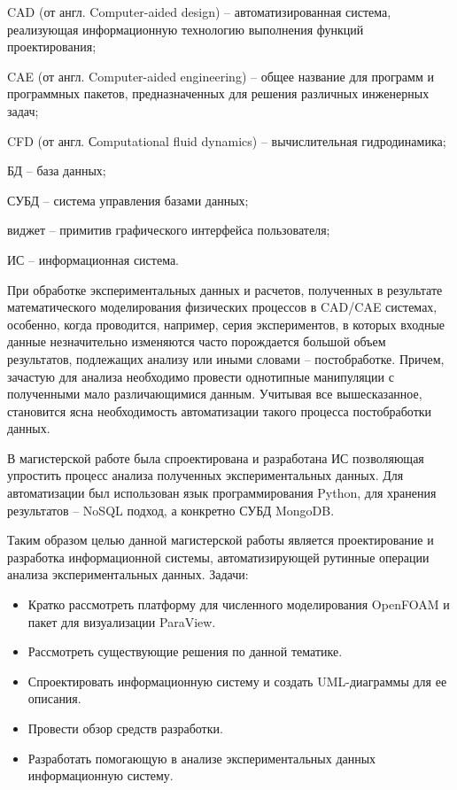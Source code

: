 \documentclass[14pt]{extreport}
\begin{document}
	\lstset{ %
		language=Python,                %
		numbers=left,                   %
		basicstyle=\scriptsize,
		inputencoding=utf8,
		extendedchars=\true
	}



\tableofcontents

\abbreviations

CAD (от англ. Computer-aided design) -- автоматизированная система, реализующая информационную технологию выполнения функций проектирования;

CAE (от англ. Computer-aided engineering) -- общее название для программ и программных пакетов, предназначенных для решения различных инженерных задач;

CFD (от англ. Сomputational fluid dynamics) -- вычислительная гидродинамика;

БД -- база данных;

СУБД -- система управления базами данных;

виджет -- примитив графического интерфейса пользователя;

ИС -- информационная система. 

\intro

При обработке экспериментальных данных и расчетов, полученных в результате математического моделирования физических процессов в CAD/CAE системах, особенно, когда проводится, например, серия экспериментов, в которых входные данные незначительно изменяются часто порождается большой объем результатов, подлежащих анализу или иными словами -- постобработке. Причем, зачастую для анализа необходимо провести однотипные манипуляции с полученными мало различающимися данным. Учитывая все вышесказанное, становится ясна необходимость автоматизации такого процесса постобработки данных. 

В магистерской работе была спроектирована и разработана ИС позволяющая упростить процесс анализа полученных экспериментальных данных. Для автоматизации был использован язык программирования Python, для хранения результатов -- NoSQL подход, а конкретно СУБД MongoDB. 

Таким образом целью данной магистерской работы является проектирование и разработка информационной системы, автоматизирующей рутинные операции анализа экспериментальных данных.
Задачи:
\begin{itemize}
\item Кратко рассмотреть платформу для численного моделирования OpenFOAM и пакет для визуализации ParaView.
\item Рассмотреть существующие решения по данной тематике.
\item Спроектировать информационную систему и создать UML-диаграммы для ее описания.
\item Провести обзор средств разработки.
\item Разработать помогающую в анализе экспериментальных данных информационную систему.
\end{itemize}
\end{document}
